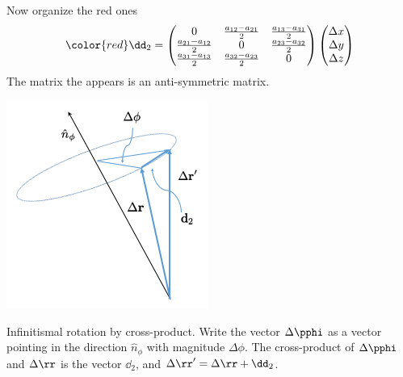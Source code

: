 Now organize the red ones
\begin{equation}
{\color{red}\dd_2  = 
\begin{pmatrix}
0 & \frac{a_{12}-a_{21}}{2} &
    \frac{a_{13}-a_{31}}{2}  \\
\frac{a_{21}-a_{12}}{2} &  0 &
    \frac{a_{23}-a_{32}}{2}  \\
\frac{a_{31}-a_{13}}{2} &
    \frac{a_{32}-a_{23}}{2} & 0 
\end{pmatrix}
\begin{pmatrix}
\Delta x \\ \Delta y  \\ \Delta z
\end{pmatrix}
 }
\label{eq:anti}
\end{equation}
The matrix the appears is an anti-symmetric matrix. 
%
 \begin{marginfigure}
  \includegraphics{figures/rotvec.png}
 \caption{Infinitismal rotation by cross-product. Write the vector $\Delta \pphi$
   as a vector pointing in the direction $\hat{n}_{\phi}$ with
   magnitude $\Delta \phi$.  The cross-product of $\Delta \pphi$ and
   $\Delta \rr$ is the vector $\dd_2$, and $\Delta \rr^{\prime} =
   \Delta \rr + \dd_2$. }
  \label{fig:rotvec}
\end{marginfigure}

